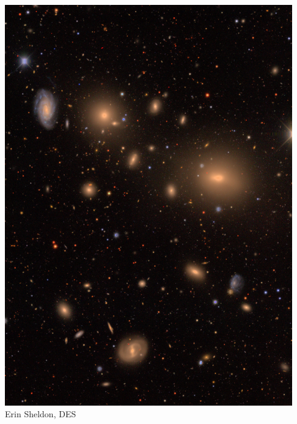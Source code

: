 \documentclass{beamer}
\begin{document}
{\begin{columns}
\begin{column}{0.5\textwidth}
\begin{enumerate}
            \end{enumerate}
        \end{column}
        \begin{column}{0.5\textwidth}
            \begin{center}
                \includegraphics[width=\textwidth]{DES0012-5705-gri-group.jpg}
                \newline
                {\tiny Erin Sheldon, DES}
            \end{center}
        \end{column}
    \end{columns}
}
\end{document}

